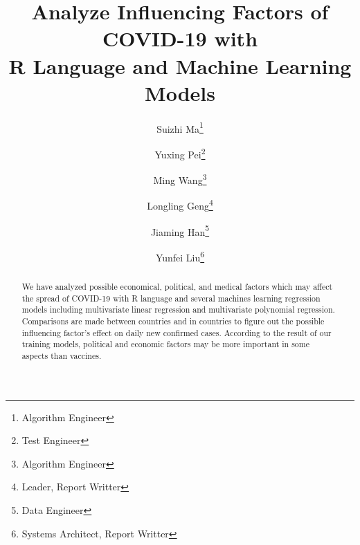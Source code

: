 \documentclass{article}
\title{Analyze Influencing Factors of COVID-19 with \\R Language and Machine Learning Models
}
\author{Suizhi Ma\thanks{Algorithm Engineer}}
\author{Yuxing Pei\thanks{Test Engineer}}
\author{Ming Wang\thanks{Algorithm Engineer}}
\author{Longling Geng\thanks{Leader, Report Writter}}
\author{Jiaming Han\thanks{Data Engineer}}
\author{Yunfei Liu\thanks{Systems Architect, Report Writter}}
\affil{Department of Computing, The Hong Kong Polytechnic University}
\date{}
\begin{document}
\maketitle


\begin{abstract}
We have analyzed possible economical, political, and medical factors which may affect the spread of COVID-19 with R language and several machines learning regression models including multivariate linear regression and multivariate polynomial regression. Comparisons are made between countries and in countries to figure out the possible influencing factor’s effect on daily new confirmed cases. According to the result of our training models, political and economic factors may be more important in some aspects than vaccines.
\end{abstract}


\end{document}
